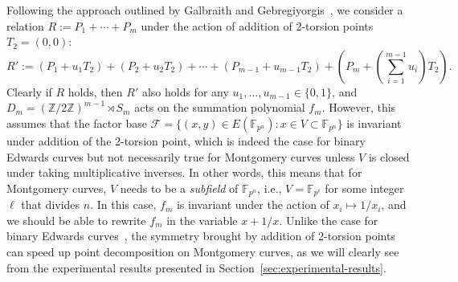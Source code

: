 \documentclass{llncs}
\newcommand{\F}[1]{\ensuremath{\mathbb F_{#1}}}
\begin{document}
Following the approach outlined by Galbraith and
Gebregiyorgis~\cite{DBLP:conf/indocrypt/GalbraithG14}, we consider a
relation $R:=P_1+\cdots+P_m$ under the action of addition of 2-torsion
points $T_2=(0,0)$:
\[ R' :=
  (P_1+u_1T_2)+(P_2+u_2T_2)+\cdots+(P_{m-1}+u_{m-1}T_2)+\left(P_m+\left(\sum_{i=1}^{m-1}u_i\right)T_2\right). \]
%
Clearly if $R$ holds, then $R'$ also holds for any
$u_1,\ldots,u_{m-1}\in\{0,1\}$, and
$D_m=(\mathbb{Z}/2\mathbb{Z})^{m-1}\rtimes S_m$ acts on the summation
polynomial $f_m$.
%
However, this assumes that the factor base
$\mathcal F=\{(x,y)\in E(\F{p^n}):x\in V\subset\F{p^n}\}$ is invariant
under addition of the 2-torsion point, which is indeed the case for
binary Edwards curves but not necessarily true for Montgomery curves
unless $V$ is closed under taking multiplicative inverses.
%
In other words, this means that for Montgomery curves, $V$ needs to be
a \emph{subfield} of $\F{p^n}$, i.e., $V=\F{p^\ell}$ for some integer
$\ell$ that divides $n$.
%
In this case, $f_m$ is invariant under the action of
$x_i\mapsto 1/x_i$, and we should be able to rewrite $f_m$ in the
variable $x+1/x$.
%
Unlike the case for binary Edwards
curves~\cite{DBLP:conf/indocrypt/GalbraithG14}, the symmetry brought
by addition of 2-torsion points can speed up point decomposition on
Montgomery curves, as we will clearly see from the experimental
results presented in Section~\ref{sec:experimental-results}.
\end{document}

